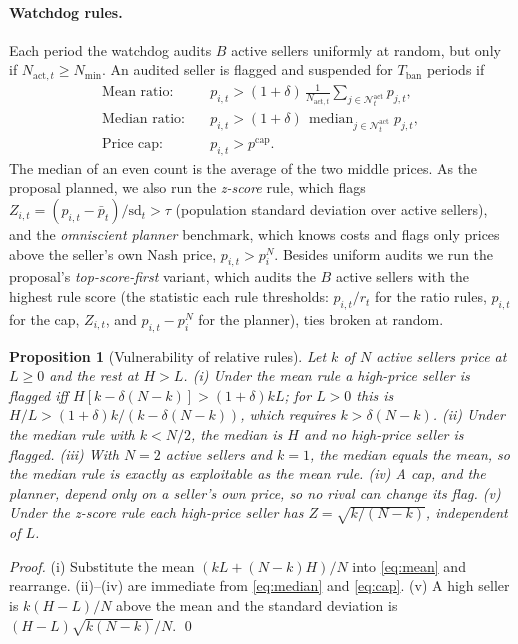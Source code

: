 \documentclass{article}
\newtheorem{proposition}{Proposition}
\newcommand{\Nact}{N_{\mathrm{act},t}}
\newcommand{\Nmin}{N_{\min}}
\newcommand{\Tban}{T_{\mathrm{ban}}}
\begin{document}
\paragraph{Watchdog rules.} Each period the watchdog audits $B$ active sellers uniformly at random, but only if $\Nact\ge \Nmin$. An audited seller is flagged and suspended for $\Tban$ periods if
\begin{align}
\text{Mean ratio:}\quad & p_{i,t}>(1+\delta)\,\tfrac{1}{\Nact}\textstyle\sum_{j\in\mathcal N^{\mathrm{act}}_t} p_{j,t}, \label{eq:mean}\\
\text{Median ratio:}\quad & p_{i,t}>(1+\delta)\,\operatorname{median}_{j\in\mathcal N^{\mathrm{act}}_t} p_{j,t}, \label{eq:median}\\
\text{Price cap:}\quad & p_{i,t}>p^{\mathrm{cap}}. \label{eq:cap}
\end{align}
The median of an even count is the average of the two middle prices. As the proposal planned, we also run the \emph{z-score} rule, which flags $Z_{i,t}=(p_{i,t}-\bar p_t)/\mathrm{sd}_t>\tau$ (population standard deviation over active sellers), and the \emph{omniscient planner} benchmark, which knows costs and flags only prices above the seller's own Nash price, $p_{i,t}>p^N_i$. Besides uniform audits we run the proposal's \emph{top-score-first} variant, which audits the $B$ active sellers with the highest rule score (the statistic each rule thresholds: $p_{i,t}/r_t$ for the ratio rules, $p_{i,t}$ for the cap, $Z_{i,t}$, and $p_{i,t}-p^N_i$ for the planner), ties broken at random.

\begin{proposition}[Vulnerability of relative rules]\label{prop:vuln}
Let $k$ of $N$ active sellers price at $L\ge0$ and the rest at $H>L$. (i) Under the mean rule a high-price seller is flagged iff $H[k-\delta(N-k)]>(1+\delta)kL$; for $L>0$ this is $H/L>(1+\delta)k/(k-\delta(N-k))$, which requires $k>\delta(N-k)$. (ii) Under the median rule with $k<N/2$, the median is $H$ and no high-price seller is flagged. (iii) With $N=2$ active sellers and $k=1$, the median equals the mean, so the median rule is exactly as exploitable as the mean rule. (iv) A cap, and the planner, depend only on a seller's own price, so no rival can change its flag. (v) Under the z-score rule each high-price seller has $Z=\sqrt{k/(N-k)}$, independent of $L$.
\end{proposition}
\emph{Proof.} (i) Substitute the mean $(kL+(N-k)H)/N$ into \eqref{eq:mean} and rearrange. (ii)--(iv) are immediate from \eqref{eq:median} and \eqref{eq:cap}. (v) A high seller is $k(H-L)/N$ above the mean and the standard deviation is $(H-L)\sqrt{k(N-k)}/N$. \qed
\end{document}
